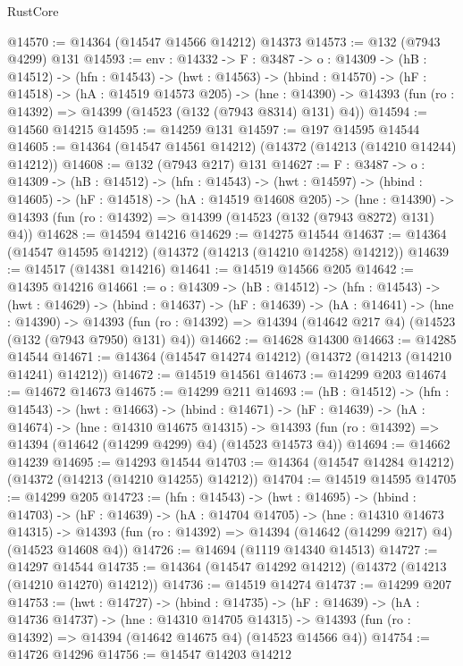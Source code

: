 \begin{lexlean}{RustCore}
\begin{coremodule}
@14570 := @14364 (@14547 @14566 @14212) @14373
@14573 := @132 (@7943 @4299) @131
@14593 := {env : @14332} ->
  {F : @3487} ->
  {o : @14309} ->
  (hB : @14512) ->
  (hfn : @14543) ->
  (hwt : @14563) ->
  (hbind : @14570) ->
  (hF : @14518) ->
  (hA : @14519 @14573 @205) ->
  (hne : @14390) -> @14393 (fun (ro : @14392) => @14399 (@14523 (@132 (@7943 @8314) @131) @4))
@14594 := @14560 @14215
@14595 := @14259 @131
@14597 := @197 @14595 @14544
@14605 := @14364 (@14547 @14561 @14212) (@14372 (@14213 (@14210 @14244) @14212))
@14608 := @132 (@7943 @217) @131
@14627 := {F : @3487} ->
  {o : @14309} ->
  (hB : @14512) ->
  (hfn : @14543) ->
  (hwt : @14597) ->
  (hbind : @14605) ->
  (hF : @14518) ->
  (hA : @14519 @14608 @205) ->
  (hne : @14390) -> @14393 (fun (ro : @14392) => @14399 (@14523 (@132 (@7943 @8272) @131) @4))
@14628 := @14594 @14216
@14629 := @14275 @14544
@14637 := @14364 (@14547 @14595 @14212) (@14372 (@14213 (@14210 @14258) @14212))
@14639 := @14517 (@14381 @14216)
@14641 := @14519 @14566 @205
@14642 := @14395 @14216
@14661 := {o : @14309} ->
  (hB : @14512) ->
  (hfn : @14543) ->
  (hwt : @14629) ->
  (hbind : @14637) ->
  (hF : @14639) ->
  (hA : @14641) ->
  (hne : @14390) ->
  @14393 (fun (ro : @14392) => @14394 (@14642 @217 @4) (@14523 (@132 (@7943 @7950) @131) @4))
@14662 := @14628 @14300
@14663 := @14285 @14544
@14671 := @14364 (@14547 @14274 @14212) (@14372 (@14213 (@14210 @14241) @14212))
@14672 := @14519 @14561
@14673 := @14299 @203
@14674 := @14672 @14673
@14675 := @14299 @211
@14693 := (hB : @14512) ->
  (hfn : @14543) ->
  (hwt : @14663) ->
  (hbind : @14671) ->
  (hF : @14639) ->
  (hA : @14674) ->
  (hne : @14310 @14675 @14315) ->
  @14393 (fun (ro : @14392) => @14394 (@14642 (@14299 @4299) @4) (@14523 @14573 @4))
@14694 := @14662 @14239
@14695 := @14293 @14544
@14703 := @14364 (@14547 @14284 @14212) (@14372 (@14213 (@14210 @14255) @14212))
@14704 := @14519 @14595
@14705 := @14299 @205
@14723 := (hfn : @14543) ->
  (hwt : @14695) ->
  (hbind : @14703) ->
  (hF : @14639) ->
  (hA : @14704 @14705) ->
  (hne : @14310 @14673 @14315) ->
  @14393 (fun (ro : @14392) => @14394 (@14642 (@14299 @217) @4) (@14523 @14608 @4))
@14726 := @14694 (@1119 @14340 @14513)
@14727 := @14297 @14544
@14735 := @14364 (@14547 @14292 @14212) (@14372 (@14213 (@14210 @14270) @14212))
@14736 := @14519 @14274
@14737 := @14299 @207
@14753 := (hwt : @14727) ->
  (hbind : @14735) ->
  (hF : @14639) ->
  (hA : @14736 @14737) ->
  (hne : @14310 @14705 @14315) ->
  @14393 (fun (ro : @14392) => @14394 (@14642 @14675 @4) (@14523 @14566 @4))
@14754 := @14726 @14296
@14756 := @14547 @14203 @14212

\end{coremodule}
\end{lexlean}
